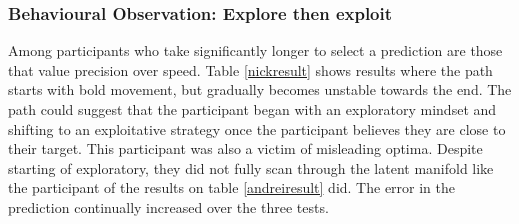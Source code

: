 \documentclass[ %
author={Dillon Keith Diep},
supervisor={Dr. Carl Henrik Ek},
degree={MEng},
title={ART-CG Hair:},
subtitle={Assisted Real-time Content Generation of Stylised Virtual Hair},
type={Research},
year={2017} ]{dissertation}
\begin{document}
\subsubsection{Behavioural Observation: Explore then exploit}

Among participants who take significantly longer to select a prediction are those that value precision over speed. Table \ref{nickresult} shows results where the path starts with bold movement, but gradually becomes unstable towards the end. The path could suggest that the participant began with an exploratory mindset and shifting to an exploitative strategy once the participant believes they are close to their target. This participant was also a victim of misleading optima. Despite starting of exploratory, they did not fully scan through the latent manifold like the participant of the results on table \ref{andreiresult} did. The error in the prediction continually increased over the three tests.
\end{document}
